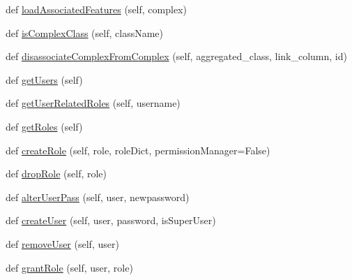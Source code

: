 \begin{DoxyCompactItemize}
\item 
def \mbox{\hyperlink{class_dsg_tools_1_1_factories_1_1_db_factory_1_1postgis_db_1_1_postgis_db_aa4e032bd36092305d6c45568404ee552}{load\+Associated\+Features}} (self, complex)
\item 
def \mbox{\hyperlink{class_dsg_tools_1_1_factories_1_1_db_factory_1_1postgis_db_1_1_postgis_db_a42c96b02611844fcf4a09d2bc0463947}{is\+Complex\+Class}} (self, class\+Name)
\item 
def \mbox{\hyperlink{class_dsg_tools_1_1_factories_1_1_db_factory_1_1postgis_db_1_1_postgis_db_ae4430782ffd26a5abaf3ba2ca8fd96c5}{disassociate\+Complex\+From\+Complex}} (self, aggregated\+\_\+class, link\+\_\+column, id)
\item 
def \mbox{\hyperlink{class_dsg_tools_1_1_factories_1_1_db_factory_1_1postgis_db_1_1_postgis_db_ac17ae70205533589c22ca8824ac246c5}{get\+Users}} (self)
\item 
def \mbox{\hyperlink{class_dsg_tools_1_1_factories_1_1_db_factory_1_1postgis_db_1_1_postgis_db_a1f4aff5bd853804b38968bdb6ad64063}{get\+User\+Related\+Roles}} (self, username)
\item 
def \mbox{\hyperlink{class_dsg_tools_1_1_factories_1_1_db_factory_1_1postgis_db_1_1_postgis_db_af105326db5d4561a3efceb80427a638e}{get\+Roles}} (self)
\item 
def \mbox{\hyperlink{class_dsg_tools_1_1_factories_1_1_db_factory_1_1postgis_db_1_1_postgis_db_ace547927f57afe2b2aaf26b122fea42c}{create\+Role}} (self, role, role\+Dict, permission\+Manager=False)
\item 
def \mbox{\hyperlink{class_dsg_tools_1_1_factories_1_1_db_factory_1_1postgis_db_1_1_postgis_db_ac16f37ab02190784d2fcc3dab44bef43}{drop\+Role}} (self, role)
\item 
def \mbox{\hyperlink{class_dsg_tools_1_1_factories_1_1_db_factory_1_1postgis_db_1_1_postgis_db_a47365bce8b9ec6b71793d7cb083fdd24}{alter\+User\+Pass}} (self, user, newpassword)
\item 
def \mbox{\hyperlink{class_dsg_tools_1_1_factories_1_1_db_factory_1_1postgis_db_1_1_postgis_db_ae9c136c6ecbd705706f3f583e4a3cce5}{create\+User}} (self, user, password, is\+Super\+User)
\item 
def \mbox{\hyperlink{class_dsg_tools_1_1_factories_1_1_db_factory_1_1postgis_db_1_1_postgis_db_ae6f0406fe4595cd02ea974e1f6758ddf}{remove\+User}} (self, user)
\item 
def \mbox{\hyperlink{class_dsg_tools_1_1_factories_1_1_db_factory_1_1postgis_db_1_1_postgis_db_a778122593c41cc689833ffe458b92477}{grant\+Role}} (self, user, role)

\end{DoxyCompactItemize}
